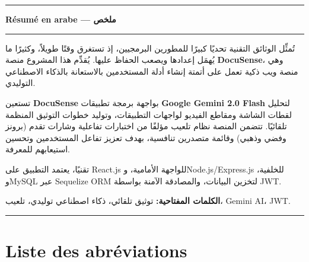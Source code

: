 \documentclass[12pt, a4paper, twoside, openany]{report}
\begin{document}
\vspace{1cm}

{\color{DSorange}\noindent\rule{\linewidth}{1.5pt}}
\begin{center}
  {\bfseries\color{DSorange} R\'esum\'e en arabe \quad --- \quad ملخص}
\end{center}
{\color{DSorange}\noindent\rule{\linewidth}{0.5pt}}
\vspace{4pt}

\begin{otherlanguage}{arabic}
تُمثِّل الوثائق التقنية تحديًا كبيرًا للمطورين البرمجيين، إذ تستغرق وقتًا طويلاً، وكثيرًا ما يُهمَل إعدادها ويصعب الحفاظ عليها. يُقدِّم هذا المشروع منصة \textbf{DocuSense}، وهي منصة ويب ذكية تعمل على أتمتة إنشاء أدلة المستخدمين بالاستعانة بالذكاء الاصطناعي التوليدي.

تستعين \textbf{DocuSense} بواجهة برمجة تطبيقات \textbf{Google Gemini 2.0 Flash} لتحليل لقطات الشاشة ومقاطع الفيديو لواجهات التطبيقات، وتوليد خطوات التوثيق المنظمة تلقائيًا. تتضمن المنصة نظام تلعيب مؤلفًا من اختبارات تفاعلية وشارات تقدم (برونز وفضي وذهبي) وقائمة متصدرين تنافسية، بهدف تعزيز تفاعل المستخدمين وتحسين استيعابهم للمعرفة.

تقنيًا، يعتمد التطبيق على React.js للواجهة الأمامية، وNode.js/Express.js للخلفية، وMySQL عبر Sequelize ORM لتخزين البيانات، والمصادقة الآمنة بواسطة JWT.

\textbf{الكلمات المفتاحية:} توثيق تلقائي، ذكاء اصطناعي توليدي، تلعيب، Gemini AI، JWT.
\end{otherlanguage}

{\color{DSorange}\noindent\rule{\linewidth}{1.5pt}}

\clearpage
\tableofcontents

\clearpage
\listoffigures
{}

\clearpage
\listoftables
{}

\clearpage
\chapter*{Liste des abr\'eviations}
\end{document}
